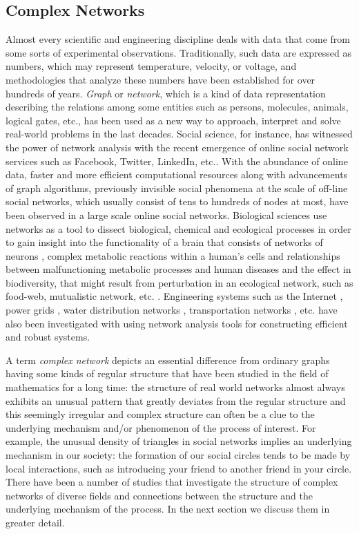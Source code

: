 \documentclass{article}
\begin{document}
	\subsection{Complex Networks}
	Almost every scientific and engineering discipline deals with data that come from some sorts of experimental observations. Traditionally, such data are expressed as numbers, which may represent temperature, velocity, or voltage, and methodologies that analyze these numbers have been established for over hundreds of years. \textit{Graph} or \textit{network}, which is a kind of data representation describing the relations among some entities such as persons, molecules, animals, logical gates, etc., has been used as a new way to approach, interpret and solve real-world problems in the last decades. Social science, for instance, has witnessed the power of network analysis with the recent emergence of online social network services such as Facebook, Twitter, LinkedIn, etc.\cite{Kleinberg:1}. With the abundance of online data, faster and more efficient computational resources along with advancements of graph algorithms, previously invisible social phenomena at the scale of off-line social networks, which usually consist of tens to hundreds of nodes at most, have been observed in a large scale online social networks.  Biological sciences use networks as a tool to dissect biological, chemical and ecological processes in order to gain insight into the functionality of a brain that consists of networks of neurons \cite{BrainNetwork}, complex metabolic reactions within a human's cells and relationships between malfunctioning metabolic processes and human diseases \cite{MetabolicNetworkAndDiseases} and the effect in biodiversity, that might result from perturbation in an ecological network, such as food-web, mutualistic network, etc. \cite{EcologicalNetwork}. Engineering systems such as the Internet \cite{Internet}, power grids \cite{PowerGrid}, water distribution networks \cite{WaterDistribution}, transportation networks \cite{Train}, etc. have also been investigated with using network analysis tools for constructing efficient and robust systems. 
	
	A term \textit{complex network} depicts an essential difference from ordinary graphs having some kinds of regular structure that have been studied in the field of mathematics for a long time: the structure of real world networks almost always exhibits an unusual pattern that greatly deviates from the regular structure and this seemingly irregular and complex structure can often be a clue to the underlying mechanism and/or phenomenon of the process of interest.  For example, the unusual density of triangles in social networks implies an underlying mechanism in our society: the formation of our social circles tends to be made by local interactions, such as introducing your friend to another friend in your circle. There have been a number of studies that investigate the structure of complex networks of diverse fields and connections between the structure and the underlying mechanism of the process. In the next section we discuss them in greater detail.
	
\end{document}
